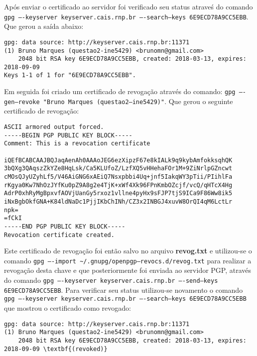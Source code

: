 \documentclass[
    article,            %
    11pt,               %
    oneside,            %
    a4paper,            %
    english,            %
    brazil,             %
    sumario=tradicional,
    ]{abntex2}
\begin{document}
Após enviar o certificado ao servidor foi verificado seu status atraveś do comando \texttt{gpg ----keyserver keyserver.cais.rnp.br ----search--keys 6E9ECD78A9CC5EBB}. Que gerou a saída abaixo:

\begin{Verbatim}[frame=single, commandchars=\\\{\}, fontsize=\footnotesize]
gpg: data source: http://keyserver.cais.rnp.br:11371
(1) Bruno Marques (questao2-ine5429) <brunomn@gmail.com>
    2048 bit RSA key 6E9ECD78A9CC5EBB, created: 2018-03-13, expires: 2018-09-09
Keys 1-1 of 1 for "6E9ECD78A9CC5EBB".
\end{Verbatim}

Em seguida foi criado um certificado de revogação através do comando: \texttt{gpg ----gen--revoke "Bruno Marques (questao2--ine5429)"}. Que gerou o seguinte certificado de revogação:

\begin{Verbatim}[frame=single, commandchars=\\\{\}, fontsize=\footnotesize]
ASCII armored output forced.
-----BEGIN PGP PUBLIC KEY BLOCK-----
Comment: This is a revocation certificate

iQEfBCABCAAJBQJaqAenAh0AAAoJEG6ezXipzF67e8kIALk9q9kybAmfokksqhQK
3bQXg3QAqszZkYZe8HqLsk/Ca5KLUfoZ/LzfXQ5vHHehaFOr1M+9ZiNrlpGZncwt
cMOsQJyUZyhLf5/V46AiGNG6xAEiQ7Nsxpbbi4Uq+jnf5IakqWY3pTii/PIihlFa
rKgya0Kw7NhOzJYfKu0pZ9A8g2e4TjK+xWf4Xk96FPnKmbOZcjf/vcQ/qHTcX4Hg
AdrP0xhRyMgBpxvfAOVjUanGy5rxoz1vllne4pyHx9sFJP7tjS9ICa9F86Ww8ik5
iNxBgbOkfGNA+K84ldNaDc1PjjIKbChINh/CZ3x2INBGJ4xuvW8OrQI4qM6LctLr
npk=
=fCkI
-----END PGP PUBLIC KEY BLOCK-----
Revocation certificate created.
\end{Verbatim}

Este certificado de revogação foi então salvo no arquivo \textbf{revog.txt} e utilizou-se o comando \texttt{gpg ----import  \textasciitilde /.gnupg/openpgp--revocs.d/revog.txt} para realizar a revogação desta chave e que posteriormente foi enviada ao servidor PGP, através do comando \texttt{gpg ----keyserver keyserver.cais.rnp.br ----send--keys 6E9ECD78A9CC5EBB}. Para verificar seu status utilizou-se novamento o comando \texttt{gpg ----keyserver keyserver.cais.rnp.br ----search--keys 6E9ECD78A9CC5EBB} que mostrou o certificado como revogado:

\begin{Verbatim}[frame=single, commandchars=\\\{\}, fontsize=\footnotesize]
gpg: data source: http://keyserver.cais.rnp.br:11371
(1) Bruno Marques (questao2-ine5429) <brunomn@gmail.com>
    2048 bit RSA key 6E9ECD78A9CC5EBB, created: 2018-03-13, expires: 2018-09-09 \textbf{(revoked)}
\end{Verbatim}
\end{document}
